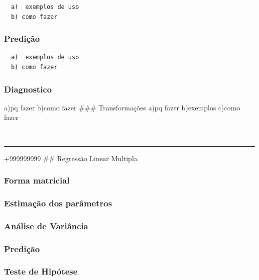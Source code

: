\documentclass[
]{article}
\begin{document}
\begin{verbatim}
  a)  exemplos de uso
  b) como fazer
\end{verbatim}

\hypertarget{prediuxe7uxe3o}{%
\subsubsection{Predição}\label{prediuxe7uxe3o}}

\begin{verbatim}
  a)  exemplos de uso
  b) como fazer
\end{verbatim}

\hypertarget{diagnostico}{%
\subsubsection{Diagnostico}\label{diagnostico}}

a)pq fazer b)como fazer \#\#\# Transformações a)pq fazer b)exemplos
c)como fazer

~

\begin{center}\rule{0.5\linewidth}{0.5pt}\end{center}

+999999999 \#\# Regressão Linear Multipla

\hypertarget{forma-matricial}{%
\subsubsection{Forma matricial}\label{forma-matricial}}

\hypertarget{estimauxe7uxe3o-dos-paruxe2metros-1}{%
\subsubsection{Estimação dos
parâmetros}\label{estimauxe7uxe3o-dos-paruxe2metros-1}}

\hypertarget{anuxe1lise-de-variuxe2ncia-1}{%
\subsubsection{Análise de
Variância}\label{anuxe1lise-de-variuxe2ncia-1}}

\hypertarget{prediuxe7uxe3o-1}{%
\subsubsection{Predição}\label{prediuxe7uxe3o-1}}

\hypertarget{teste-de-hipuxf3tese-1}{%
\subsubsection{Teste de Hipótese}\label{teste-de-hipuxf3tese-1}}
\end{document}
